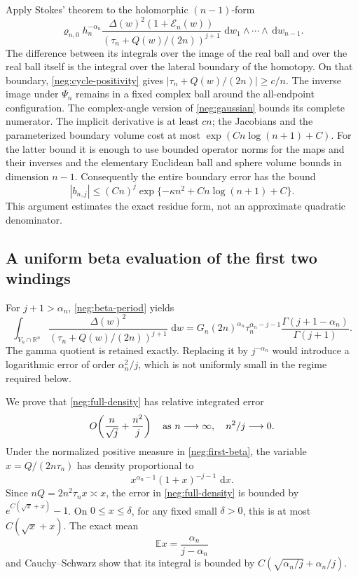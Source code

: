 \documentclass[11pt]{article}
\numberwithin{equation}{section}
\theoremstyle{definition}
\newcommand{\R}{\mathbb R}
\newcommand{\dd}{\,\mathrm d}
\begin{document}
Apply Stokes' theorem to the holomorphic \((n-1)\)-form
\[
 \varrho_{n,0}h_n^{-\alpha_n}
 \frac{\Delta(w)^2(1+\mathcal E_n(w))}
      {(\tau_n+Q(w)/(2n))^{j+1}}
       \,\dd w_1\wedge\cdots\wedge\dd w_{n-1}.
 \]
The difference between its integrals over the image of the
real ball and over the real ball itself is the integral over
the lateral boundary of the homotopy.  On that boundary,
\eqref{neg:cycle-positivity} gives
\(|\tau_n+Q(w)/(2n)|\ge c/n\).
The inverse image under \(\Psi_n\) remains in a fixed
complex ball around the all-endpoint configuration.  The
complex-angle version of \eqref{neg:gaussian} bounds its
complete numerator.  The implicit derivative is at least
\(cn\); the Jacobians and the parameterized boundary volume
cost at most \(\exp(Cn\log(n+1)+C)\).
For the latter bound it is enough to use bounded operator
norms for the maps and their inverses and the elementary
Euclidean ball and sphere volume bounds in dimension \(n-1\).
Consequently the entire boundary error has the bound
\begin{equation}
 |b_{n,j}|\le
 (Cn)^j\exp\{-\kappa n^2+C n\log(n+1)+C\}.
 \label{neg:cycle-error}
\end{equation}
This argument estimates the exact residue form, not an
approximate quadratic denominator.

\subsection{A uniform beta evaluation of the first two windings}
\label{neg:beta-evaluation}

For \(j+1>\alpha_n\), \eqref{neg:beta-period} yields
\begin{equation}
 \int_{V_n\cap\R^n}
 \frac{\Delta(w)^2}
      {(\tau_n+Q(w)/(2n))^{j+1}}\,\dd w
 =
 G_n(2n)^{\alpha_n}\tau_n^{\alpha_n-j-1}
       \frac{\Gamma(j+1-\alpha_n)}{\Gamma(j+1)}.
 \label{neg:first-beta}
\end{equation}
The gamma quotient is retained exactly.  Replacing it by
\(j^{-\alpha_n}\) would introduce a logarithmic error of
order \(\alpha_n^2/j\), which is not uniformly small in
the regime required below.

We prove that \eqref{neg:full-density} has relative integrated
error
\begin{equation}
 O\!\left(\frac n{\sqrt j}+\frac{n^2}{j}\right)
 \quad\hbox{as }n\longrightarrow\infty,\quad n^2/j\longrightarrow0.
 \label{neg:relative-beta-error}
\end{equation}
Under the normalized positive measure in
\eqref{neg:first-beta}, the variable
\(x=Q/(2n\tau_n)\) has density proportional to
\[
 x^{\alpha_n-1}(1+x)^{-j-1}\,\dd x .
 \]
Since \(nQ=2n^2\tau_n x\asymp x\),
the error in \eqref{neg:full-density} is bounded by
\(e^{C(\sqrt x+x)}-1\).  On \(0\le x\le\delta\), for any
fixed small \(\delta>0\), this is at most \(C(\sqrt x+x)\).
The exact mean
\[
 \mathbb E x=\frac{\alpha_n}{j-\alpha_n}
 \]
and Cauchy--Schwarz show that its integral is bounded by
\(C(\sqrt{\alpha_n/j}+\alpha_n/j)\).
\end{document}
